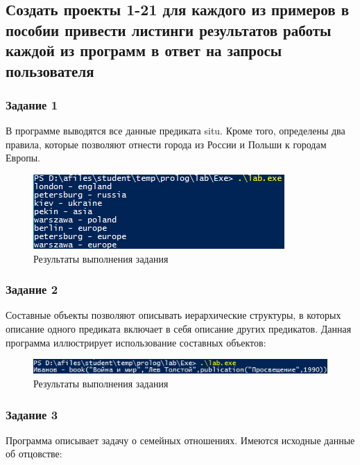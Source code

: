 \documentclass[14pt,a4paper,report]{report}
\begin{document}
\subsection{Создать проекты 1-21 для каждого из примеров в пособии привести листинги результатов работы каждой из программ в ответ на запросы пользователя}

\subsubsection{Задание 1}

В программе выводятся все данные предиката situ. Кроме того, определены два правила, которые позволяют отнести города из России и Польши к городам Европы. 



\begin{figure}[h!]
	\centering
	\includegraphics[scale = 1.0]{images/d1.png}
	\caption{Результаты выполнения задания}
\end{figure}

\subsubsection{Задание 2}

Составные объекты позволяют описывать иерархические структуры, в которых описание одного предиката включает в себя описание других предикатов. Данная программа иллюстрирует использование составных объектов:



\begin{figure}[h!]
	\centering
	\includegraphics[scale = 1.0]{images/d2.png}
	\caption{Результаты выполнения задания}
\end{figure}

\subsubsection{Задание 3}

Программа описывает задачу о семейных отношениях. Имеются исходные данные об отцовстве: 
\end{document}
